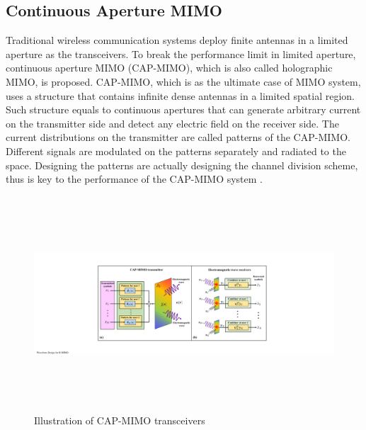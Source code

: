 \documentclass[journal,twocolumn]{IEEEtran}
\begin{document}

\subsection{Continuous Aperture MIMO}
Traditional wireless communication systems deploy finite antennas in a limited aperture as the transceivers. To break the performance limit in limited aperture, continuous aperture MIMO (CAP-MIMO), which is also called holographic MIMO, is proposed. CAP-MIMO, which is as the ultimate case of MIMO system, uses a structure that contains infinite dense antennas in a limited spatial region. Such structure equals to continuous apertures that can generate arbitrary current on the transmitter side and detect any electric field on the receiver side. The current distributions on the transmitter are called patterns of the CAP-MIMO. Different signals are modulated on the patterns separately and radiated to the space. Designing the patterns are actually designing the channel division scheme, thus is key to the performance of the CAP-MIMO system \cite{zhang2022pdma}.

\begin{figure}
	\centering 
	\includegraphics[height=8cm, width=15cm]{figures/CAPMIMO.pdf} 
	\caption{Illustration of CAP-MIMO transceivers \cite{zhang2022pdma} }
	\label{fig:CAPMIMO}
\end{figure}
\end{document}
